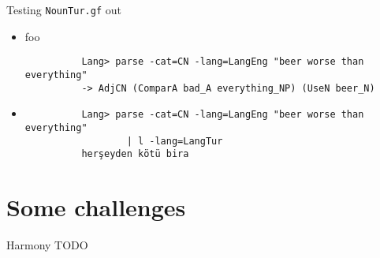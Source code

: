 \documentclass{beamer}
\begin{document}
  \begin{frame}[fragile]{Testing \texttt{NounTur.gf} out}
    \begin{itemize}
      \item<1-> foo
        \begin{lstlisting}
          Lang> parse -cat=CN -lang=LangEng "beer worse than everything"
          -> AdjCN (ComparA bad_A everything_NP) (UseN beer_N)
        \end{lstlisting}
      \item<2->
        \begin{lstlisting}
          Lang> parse -cat=CN -lang=LangEng "beer worse than everything"
                  | l -lang=LangTur
          herşeyden kötü bira
        \end{lstlisting}
    \end{itemize}
  \end{frame}

  \section{Some challenges}

  \begin{frame}{Harmony}
    TODO
  \end{frame}
\end{document}
